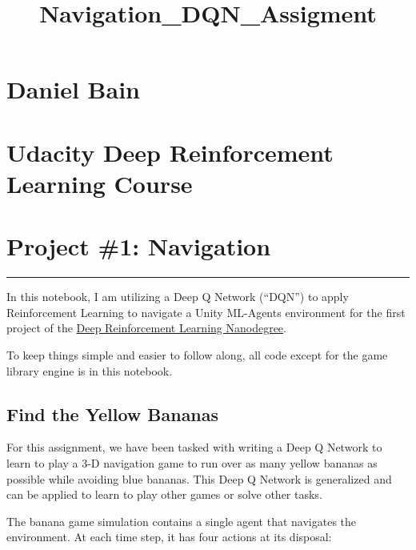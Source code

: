 \documentclass[11pt]{article}
\title{Navigation\_DQN\_Assigment}
\begin{document}
    
    
    \maketitle
    
    

    
    \hypertarget{daniel-bain}{%
\section{Daniel Bain}\label{daniel-bain}}

\hypertarget{udacity-deep-reinforcement-learning-course}{%
\section{Udacity Deep Reinforcement Learning
Course}\label{udacity-deep-reinforcement-learning-course}}

\hypertarget{project-1-navigation}{%
\section{Project \#1: Navigation}\label{project-1-navigation}}

\begin{center}\rule{0.5\linewidth}{\linethickness}\end{center}

In this notebook, I am utilizing a Deep Q Network (``DQN'') to apply
Reinforcement Learning to navigate a Unity ML-Agents environment for the
first project of the
\href{https://www.udacity.com/course/deep-reinforcement-learning-nanodegree--nd893}{Deep
Reinforcement Learning Nanodegree}.

To keep things simple and easier to follow along, all code except for
the game library engine is in this notebook.

\hypertarget{find-the-yellow-bananas}{%
\subsection{Find the Yellow Bananas}\label{find-the-yellow-bananas}}

For this assignment, we have been tasked with writing a Deep Q Network
to learn to play a 3-D navigation game to run over as many yellow
bananas as possible while avoiding blue bananas. This Deep Q Network is
generalized and can be applied to learn to play other games or solve
other tasks.

The banana game simulation contains a single agent that navigates the
environment. At each time step, it has four actions at its disposal:
\end{document}
